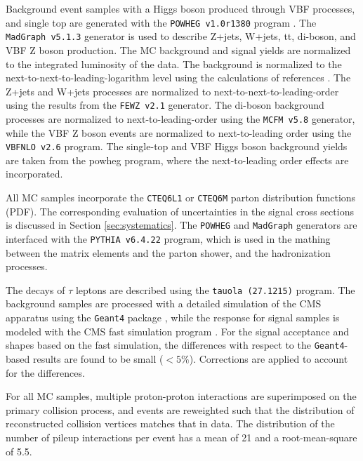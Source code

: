 Background event samples with a Higgs boson produced through VBF processes, and single top are generated with the \texttt{POWHEG v1.0r1380} program \cite{Frixione:2007vw}. 
The \texttt{MadGraph v5.1.3} generator is used to describe Z+jets, W+jets, tt, di-boson, and VBF Z boson production. The MC background and signal yields are normalized to the integrated luminosity of the data. 
The \ttbar background is normalized to the next-to-next-to-leading-logarithm level using the calculations of references \cite{Czakon:2013goa,Melnikov:2006kv}. 
The Z+jets and W+jets processes are normalized to next-to-next-to-leading-order using the results from the \texttt{FEWZ v2.1} \cite{Gavin:2010az} generator. 
The di-boson background processes are normalized to next-to-leading-order using the \texttt{MCFM v5.8} \cite{Campbell:2010ff} generator, while the VBF Z boson events are normalized to next-to-leading order using the \texttt{VBFNLO v2.6} \cite{Arnold:2008rz,Arnold:2011wj}program. 
The single-top and VBF Higgs boson background yields are taken from the powheg program, where the next-to-leading order effects are incorporated.

All MC samples incorporate the \texttt{CTEQ6L1} \cite{Pumplin:2002vw} or \texttt{CTEQ6M} \cite{Nadolsky:2008zw} parton distribution functions (PDF). The corresponding evaluation of uncertainties in the signal cross sections is discussed in Section \ref{sec:systematics}. The \texttt{POWHEG} and \texttt{MadGraph} generators are interfaced with the \texttt{PYTHIA v6.4.22} \cite{Sjostrand:2006za} program, which is used in the mathing between the matrix elements and the parton shower, and the hadronization processes. 


The decays of $\tau$ leptons are described using the \texttt{tauola (27.1215)} \cite{Davidson:2010rw} program. The background samples are processed with a detailed simulation of the CMS apparatus using the \texttt{Geant4} package \cite{Agostinelli:2002hh}, while the response for signal samples is modeled with the CMS fast simulation program \cite{Abdullin:2011zz}. For the signal acceptance and \mjj shapes based on the fast simulation, the differences with respect to the \texttt{Geant4}-based results are found to be small ($< 5\%$). Corrections are applied to account for the differences. 

For all MC samples, multiple proton-proton interactions are superimposed on the primary collision process, and events are reweighted such that the distribution of reconstructed collision vertices matches that in data. The distribution of the number of pileup interactions per event has a mean of 21 and a root-mean-square of 5.5. 

